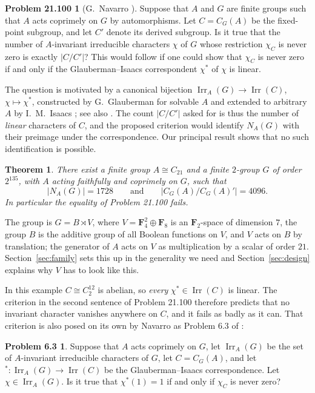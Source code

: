 \documentclass[11pt]{article}
\newtheorem{lettertheorem}{Theorem}
\theoremstyle{definition}
\newtheorem*{problem}{Problem 21.100}
\newtheorem*{problem63}{Problem 6.3}
\theoremstyle{remark}
\newcommand{\F}{\mathbf F}
\newcommand{\Irr}{\operatorname{Irr}}
\begin{document}
\begin{problem}[G.~Navarro \cite{kourovka}]
Suppose that $A$ and $G$ are finite groups such that $A$ acts coprimely
on $G$ by automorphisms.  Let $C=C_G(A)$ be the fixed-point subgroup,
and let $C'$ denote its derived subgroup.  Is it true that the number of
$A$-invariant irreducible characters $\chi$ of $G$ whose restriction
$\chi_C$ is never zero is exactly $|C/C'|$?  This would follow if one
could show that $\chi_C$ is never zero if and only if the
Glauberman--Isaacs correspondent $\chi^*$ of $\chi$ is linear.
\end{problem}

The question is motivated by a canonical bijection
$\Irr_A(G)\to\Irr(C)$, $\chi\mapsto\chi^*$, constructed by
G.~Glauberman \cite{glauberman} for solvable $A$ and extended to
arbitrary $A$ by I.~M.~Isaacs \cite{isaacs1973}; see also
\cite[Chapter 2]{navarro-book}.  The count $|C/C'|$ asked for is thus
the number of \emph{linear} characters of $C$, and the proposed
criterion would identify $N_A(G)$ with their preimage under the
correspondence.  Our principal result shows that no such identification
is possible.

\begin{lettertheorem}\label{thm:main}
There exist a finite group $A\cong C_{21}$ and a finite $2$-group
$G$ of order $2^{135}$, with $A$ acting faithfully and coprimely on
$G$, such that
\[
 |N_A(G)|=1728
 \qquad\text{and}\qquad
 |C_G(A)/C_G(A)'|=4096 .
\]
In particular the equality of Problem 21.100 fails.
\end{lettertheorem}

The group is $G=B\rtimes V$, where $V=\F_4^2\oplus\F_8$ is an
$\F_2$-space of dimension $7$, the group $B$ is the additive group of
all Boolean functions on $V$, and $V$ acts on $B$ by translation; the
generator of $A$ acts on $V$ as multiplication by a scalar of order
$21$.  Section~\ref{sec:family} sets this up in the generality we need
and Section~\ref{sec:design} explains why $V$ has to look like this.

In this example $C\cong C_2^{12}$ is abelian, so \emph{every}
$\chi^*\in\Irr(C)$ is linear.  The criterion in the second sentence of
Problem 21.100 therefore predicts that no invariant character vanishes
anywhere on $C$, and it fails as badly as it can.  That criterion is
also posed on its own by Navarro as Problem 6.3 of
\cite{navarro-problems}:

\begin{problem63}\label{prob:63}
Suppose that $A$ acts coprimely on $G$, let $\Irr_A(G)$ be the set of
$A$-invariant irreducible characters of $G$, let $C=C_G(A)$, and let
${}^*\colon\Irr_A(G)\to\Irr(C)$ be the Glauberman--Isaacs
correspondence.  Let $\chi\in\Irr_A(G)$.  Is it true that
$\chi^*(1)=1$ if and only if $\chi_C$ is never zero?
\end{problem63}
\end{document}
